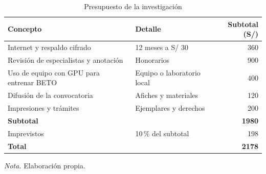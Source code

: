 \begin{table}[H]
\begin{threeparttable}
\caption{Presupuesto de la investigación}
\label{tab:presupuesto}
\singlespacing
\renewcommand{\arraystretch}{1.25}
\begin{tabular}{@{}L{6.4cm} L{5.4cm} r@{}}
\toprule
\textbf{Concepto} & \textbf{Detalle} & \textbf{Subtotal (S/)} \\
\midrule
Internet y respaldo cifrado & 12 meses a S/ 30 & 360 \\
Revisión de especialistas y anotación & Honorarios & 900 \\
Uso de equipo con GPU para entrenar BETO & Equipo o laboratorio local & 400 \\
Difusión de la convocatoria & Afiches y materiales & 120 \\
Impresiones y trámites & Ejemplares y derechos & 200 \\
\midrule
\textbf{Subtotal} & & \textbf{1980} \\
Imprevistos & 10\,\% del subtotal & 198 \\
\midrule
\textbf{Total} & & \textbf{2178} \\
\bottomrule
\end{tabular}
\begin{tablenotes}[flushleft]
\small
\item \textit{Nota.} Elaboración propia.
\end{tablenotes}
\end{threeparttable}
\end{table}
